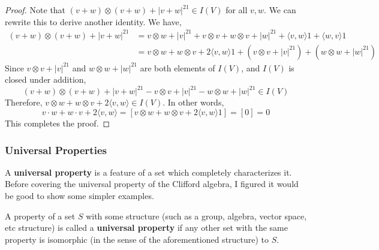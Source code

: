 \begin{proof}
    Note that $(v+w)\otimes (v+w) + |v+w|^21 
 \in I(V)$ for all $v,w$. We can rewrite this to derive another identity.
    We have,
    \begin{align*}
        (v+w)\otimes (v+w) + |v+w|^21&= v\otimes w + |v|^21 +v\otimes v +  w\otimes v + |w|^21 + \langle v,w\rangle1 + \langle w,v\rangle1\\
        &= v\otimes w + w\otimes v + 2\langle v,w\rangle1 + (v\otimes v+|v|^21) + (w\otimes w+|w|^21)
    \end{align*}
    Since $v\otimes v + |v|^21$ and $w\otimes w+|w|^21$ are both elements of $I(V)$, and $I(V)$ is closed under addition,
    \[(v+w)\otimes (v+w) + |v+w|^21-v\otimes v + |v|^21-w\otimes w+|w|^21 \in I(V)\]
    Therefore, $v\otimes w + w\otimes v + 2\langle v,w\rangle \in I(V)$. In other words,
    \[
        v\cdot w + w\cdot v + 2\langle v,w\rangle = [v\otimes w + w\otimes v + 2\langle v,w\rangle1] = [0] = 0
    \]
    This completes the proof.
\end{proof}
\subsubsection{Universal Properties}
A \textbf{universal property} is a feature of a set which completely characterizes it. Before covering the universal property of the Clifford algebra, I figured it would be good to show some simpler examples.
\begin{defn} 
    A property of a set $S$ with some structure (such as a group, algebra, vector space, etc structure) is called a \textbf{universal property} if any other set with the same property is isomorphic (in the sense of the aforementioned structure) to $S$.
\end{defn}

